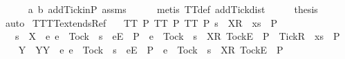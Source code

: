 \ \ \ \ \isamarkupfalse%
\ a\ b\ add{\isacharunderscore}Tick{\isacharunderscore}in{\isacharunderscore}P\ assms\isanewline
\ \ \ \ \isamarkupfalse%
\ {\isacharparenleft}metis\ TT{}{\isacharunderscore}def\ add{\isacharunderscore}Tick{\isacharunderscore}dist{\isacharparenright}\isanewline
\ \ \isamarkupfalse%
\ \isamarkupfalse%
\ {\isacharquery}thesis\ \isamarkupfalse%
\ auto\isanewline
{}\isamarkupfalse%
%
\endisatagproof
{\isafoldproof}%
%
\isadelimproof
\isanewline
%
\endisadelimproof
\isanewline
{}\isamarkupfalse%
\ TT{}{\isacharunderscore}TT{}{\isacharunderscore}extends{\isacharunderscore}Ref{\isacharcolon}\isanewline
\ \ \ {\isachardoublequoteopen}TT{}\ P{\isachardoublequoteclose}\ {\isachardoublequoteopen}TT{}\ P{\isachardoublequoteclose}\ {\isachardoublequoteopen}TT{}\ P{\isachardoublequoteclose}\ {\isachardoublequoteopen}s\ {\isacharat}\ {\isacharbrackleft}{\isacharbrackleft}X{\isacharbrackright}\isactrlsub R{\isacharbrackright}\ {\isacharat}\ xs\ {\isasymin}\ P{\isachardoublequoteclose}\isanewline
\ \ \ {\isachardoublequoteopen}s\ {\isacharat}\ {\isacharbrackleft}{\isacharbrackleft}X\ {\isasymunion}\ {\isacharbraceleft}e{\isachardot}\ e\ {\isasymnoteq}\ Tock\ {\isasymand}\ s\ {\isacharat}\ {\isacharbrackleft}{\isacharbrackleft}e{\isacharbrackright}\isactrlsub E{\isacharbrackright}\ {\isasymnotin}\ P\ {\isasymor}\ e\ {\isacharequal}\ Tock\ {\isasymand}\ s\ {\isacharat}\ {\isacharbrackleft}{\isacharbrackleft}X{\isacharbrackright}\isactrlsub R{\isacharcomma}\ {\isacharbrackleft}Tock{\isacharbrackright}\isactrlsub E{\isacharbrackright}\ {\isasymnotin}\ P{\isacharbraceright}\ {\isasymunion}\ {\isacharbraceleft}Tick{\isacharbraceright}{\isacharbrackright}\isactrlsub R{\isacharbrackright}\ {\isacharat}\ xs\ {\isasymin}\ P{\isachardoublequoteclose}\isanewline
%
\isadelimproof
%
\endisadelimproof
%
\isatagproof
{}\isamarkupfalse%
\ {\isacharminus}\isanewline
\ \ \isamarkupfalse%
\ Y\ \ Y{\isacharcolon}{\isachardoublequoteopen}Y\ {\isacharequal}\ {\isacharbraceleft}e{\isachardot}\ e\ {\isasymnoteq}\ Tock\ {\isasymand}\ s\ {\isacharat}\ {\isacharbrackleft}{\isacharbrackleft}e{\isacharbrackright}\isactrlsub E{\isacharbrackright}\ {\isasymnotin}\ P\ {\isasymor}\ e\ {\isacharequal}\ Tock\ {\isasymand}\ s\ {\isacharat}\ {\isacharbrackleft}{\isacharbrackleft}X{\isacharbrackright}\isactrlsub R{\isacharcomma}\ {\isacharbrackleft}Tock{\isacharbrackright}\isactrlsub E{\isacharbrackright}\ {\isasymnotin}\ P{\isacharbraceright}{\isachardoublequoteclose}\isanewline
